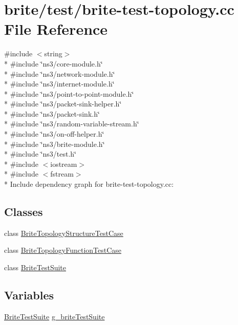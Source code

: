 \hypertarget{brite-test-topology_8cc}{}\section{brite/test/brite-\/test-\/topology.cc File Reference}
\label{brite-test-topology_8cc}
{\ttfamily \#include $<$string$>$}\\*
{\ttfamily \#include \char`\"{}ns3/core-\/module.\+h\char`\"{}}\\*
{\ttfamily \#include \char`\"{}ns3/network-\/module.\+h\char`\"{}}\\*
{\ttfamily \#include \char`\"{}ns3/internet-\/module.\+h\char`\"{}}\\*
{\ttfamily \#include \char`\"{}ns3/point-\/to-\/point-\/module.\+h\char`\"{}}\\*
{\ttfamily \#include \char`\"{}ns3/packet-\/sink-\/helper.\+h\char`\"{}}\\*
{\ttfamily \#include \char`\"{}ns3/packet-\/sink.\+h\char`\"{}}\\*
{\ttfamily \#include \char`\"{}ns3/random-\/variable-\/stream.\+h\char`\"{}}\\*
{\ttfamily \#include \char`\"{}ns3/on-\/off-\/helper.\+h\char`\"{}}\\*
{\ttfamily \#include \char`\"{}ns3/brite-\/module.\+h\char`\"{}}\\*
{\ttfamily \#include \char`\"{}ns3/test.\+h\char`\"{}}\\*
{\ttfamily \#include $<$iostream$>$}\\*
{\ttfamily \#include $<$fstream$>$}\\*
Include dependency graph for brite-\/test-\/topology.cc\+:
\subsection*{Classes}
\begin{DoxyCompactItemize}
\item 
class \hyperlink{classBriteTopologyStructureTestCase}{Brite\+Topology\+Structure\+Test\+Case}
\item 
class \hyperlink{classBriteTopologyFunctionTestCase}{Brite\+Topology\+Function\+Test\+Case}
\item 
class \hyperlink{classBriteTestSuite}{Brite\+Test\+Suite}
\end{DoxyCompactItemize}
\subsection*{Variables}
\begin{DoxyCompactItemize}
\item 
\hyperlink{classBriteTestSuite}{Brite\+Test\+Suite} \hyperlink{brite-test-topology_8cc_abfdfd20aef05bfe862d6c1f8e35f95c7}{g\+\_\+brite\+Test\+Suite}
\end{DoxyCompactItemize}



